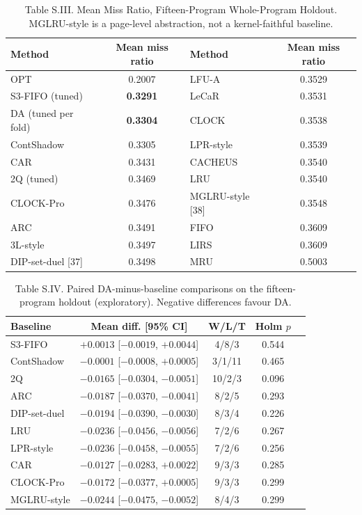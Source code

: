 \documentclass[journal,onecolumn]{IEEEtran}
\begin{document}
\begin{table}[!t]
\caption{Table S.III. Mean Miss Ratio, Fifteen-Program Whole-Program Holdout. MGLRU-style is a page-level abstraction, not a kernel-faithful baseline.}
\label{tab:opo}
\footnotesize
\centering
\begin{tabular}{@{}lc@{\hspace{2.5em}}lc@{}}
\toprule
Method & Mean miss ratio & Method & Mean miss ratio \\
\midrule
OPT & 0.2007 & LFU-A & 0.3529 \\
S3-FIFO (tuned) & \textbf{0.3291} & LeCaR & 0.3531 \\
DA (tuned per fold) & \textbf{0.3304} & CLOCK & 0.3538 \\
ContShadow & 0.3305 & LPR-style & 0.3539 \\
CAR & 0.3431 & CACHEUS & 0.3540 \\
2Q (tuned) & 0.3469 & LRU & 0.3540 \\
CLOCK-Pro & 0.3476 & MGLRU-style [38] & 0.3548 \\
ARC & 0.3491 & FIFO & 0.3609 \\
3L-style & 0.3497 & LIRS & 0.3609 \\
DIP-set-duel [37] & 0.3498 & MRU & 0.5003 \\
\bottomrule
\end{tabular}
\end{table}

\begin{table}[!t]
\caption{Table S.IV. Paired DA-minus-baseline comparisons on the fifteen-program holdout (exploratory). Negative differences favour DA.}
\label{tab:opo-paired}
\footnotesize
\setlength{\tabcolsep}{3pt}
\begin{tabular}{@{}lcccc@{}}
\toprule
Baseline & Mean diff. [95\% CI] & W/L/T & Holm $p$ \\
\midrule
S3-FIFO & $+0.0013$ [$-0.0019$, $+0.0044$] & 4/8/3 & 0.544 \\
ContShadow & $-0.0001$ [$-0.0008$, $+0.0005$] & 3/1/11 & 0.465 \\
2Q & $-0.0165$ [$-0.0304$, $-0.0051$] & 10/2/3 & 0.096 \\
ARC & $-0.0187$ [$-0.0370$, $-0.0041$] & 8/2/5 & 0.293 \\
DIP-set-duel & $-0.0194$ [$-0.0390$, $-0.0030$] & 8/3/4 & 0.226 \\
LRU & $-0.0236$ [$-0.0456$, $-0.0056$] & 7/2/6 & 0.267 \\
LPR-style & $-0.0236$ [$-0.0458$, $-0.0055$] & 7/2/6 & 0.256 \\
CAR & $-0.0127$ [$-0.0283$, $+0.0022$] & 9/3/3 & 0.285 \\
CLOCK-Pro & $-0.0172$ [$-0.0377$, $+0.0005$] & 9/3/3 & 0.299 \\
MGLRU-style & $-0.0244$ [$-0.0475$, $-0.0052$] & 8/4/3 & 0.299 \\
\bottomrule
\end{tabular}
\end{table}
\end{document}
